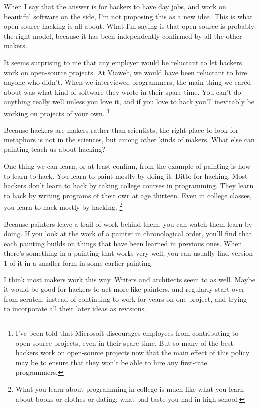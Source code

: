 When I say that the answer is for hackers to have day jobs, and work on
beautiful software on the side, I'm not proposing this as a new idea.
This is what open-source hacking is all about. What I'm saying is that
open-source is probably the right model, because it has been
independently confirmed by all the other makers.

It seems surprising to me that any employer would be reluctant to let
hackers work on open-source projects. At Viaweb, we would have been
reluctant to hire anyone who didn't. When we interviewed programmers,
the main thing we cared about was what kind of software they wrote in
their spare time. You can't do anything really well unless you love it,
and if you love to hack you'll inevitably be working on projects of your
own. \footnote{I've been told that Microsoft discourages employees from
contributing to open-source projects, even in their spare time. But so
many of the best hackers work on open-source projects now that the main
effect of this policy may be to ensure that they won't be able to hire
any first-rate programmers.}

Because hackers are makers rather than scientists, the right place to
look for metaphors is not in the sciences, but among other kinds of
makers. What else can painting teach us about hacking?

One thing we can learn, or at least confirm, from the example of
painting is how to learn to hack. You learn to paint mostly by doing it.
Ditto for hacking. Most hackers don't learn to hack by taking college
courses in programming. They learn to hack by writing programs of their
own at age thirteen. Even in college classes, you learn to hack mostly
by hacking. \footnote{What you learn about programming in college is much like what
you learn about books or clothes or dating: what bad taste you had in
high school.}

Because painters leave a trail of work behind them, you can watch them
learn by doing. If you look at the work of a painter in chronological
order, you'll find that each painting builds on things that have been
learned in previous ones. When there's something in a painting that
works very well, you can usually find version 1 of it in a smaller form
in some earlier painting.

I think most makers work this way. Writers and architects seem to as
well. Maybe it would be good for hackers to act more like painters, and
regularly start over from scratch, instead of continuing to work for
years on one project, and trying to incorporate all their later ideas as
revisions.

